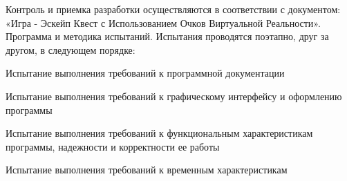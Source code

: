 Контроль и приемка разработки осуществляются в соответствии с документом: «Игра - Эскейп Квест с Использованием Очков Виртуальной Реальности». Программа и методика испытаний. Испытания проводятся поэтапно, друг за другом, в следующем порядке:
\begin{my_enumerate}
	\item Испытание выполнения требований к программной документации
	\item Испытание выполнения требований к графическому интерфейсу и оформлению программы
	\item Испытание выполнения требований к функциональным характеристикам программы, надежности и корректности ее работы
	\item Испытание выполнения требований к временным характеристикам
\end{my_enumerate}
